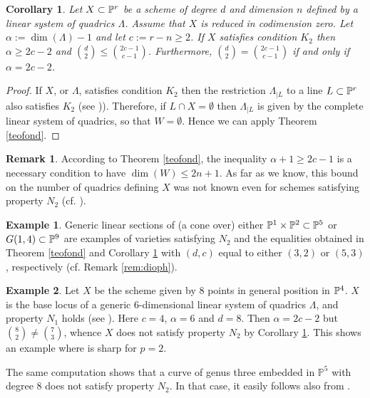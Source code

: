 \documentclass{amsart}
\newtheorem{corollary}{Corollary}
\theoremstyle{definition}
\newtheorem{remark}{Remark}
\newtheorem{example}{Example}
\begin{document}
\begin{corollary}
\label{corK2} Let $X\subset\Bbb{P}^{r}$ be a scheme of degree $d$
and dimension $n$ defined by a linear system of quadrics $\Lambda$.
Assume that $X$ is reduced in codimension zero. Let
$\alpha:=\dim(\Lambda)-1$ and let $c:=r-n\geq 2$. If $X$ satisfies
condition $K_{2}$ then $\alpha \geq 2c-2$ and $\binom{d}{2}\leq
\binom{2c-1}{c-1}$. Furthermore, $\binom{d}{2}=\binom{2c-1}{c-1}$ if
and only if $\alpha=2c-2$.
\end{corollary}

\begin{proof}
If $X$, or $\Lambda$, satisfies condition $K_2$ then the restriction
$\Lambda_{|L}$ to a line $L\subset\Bbb{P}^{r}$ also satisfies $K_2$
(see \cite[Lemma 4.2]{v})). Therefore, if $L\cap X=\emptyset$ then
$\Lambda_{|L}$ is given by the complete linear system of quadrics,
so that $W=\emptyset$. Hence we can apply Theorem \ref{teofond}.
\end{proof}

\begin{remark}
According to Theorem \ref{teofond}, the inequality $\alpha+1\geq
2c-1$ is a necessary condition to have $\dim(W)\leq 2n+1$. As far as
we know, this bound on the number of quadrics defining $X$ was not
known even for schemes satisfying property $N_2$ (cf.
\cite[Corollary 3.7 and Remark 3.9]{h-k}).
\end{remark}

\begin{example}
Generic linear sections of (a cone over) either
$\Bbb{P}^{1}\times\Bbb{P}^{2}\subset\Bbb{P}^{5}$ or
$G(1,4)\subset\Bbb{P}^{9}$ are examples of varieties satisfying
$N_2$ and the equalities obtained in Theorem \ref{teofond} and
Corollary \ref{corK2} with $(d,c)$ equal to either $(3,2)$ or
$(5,3)$, respectively (cf. Remark \ref{rem:dioph}).
\end{example}

\begin{example}\label{ex:8points}
Let $X$ be the scheme given by $8$ points in general position in
$\Bbb{P}^{4}$. $X$ is the base locus of a generic $6$-dimensional
linear system of quadrics $\Lambda$, and property $N_{1}$ holds (see
\cite[Theorem 1]{gl}). Here $c=4$, $\alpha=6$ and $d=8$. Then
$\alpha=2c-2$ but $\binom{8}{2}\neq\binom{7}{3}$, whence $X$ does
not satisfy property $N_2$ by Corollary \ref{corK2}. This shows an
example where \cite[Theorem 1]{gl} is sharp for $p=2$.

The same computation shows that a curve of genus three embedded in
${{\mathbb P}}^5$ with degree $8$ does not satisfy property $N_2$. In that
case, it easily follows also from \cite[Theorem 2]{gl}.
\end{example}
\end{document}
